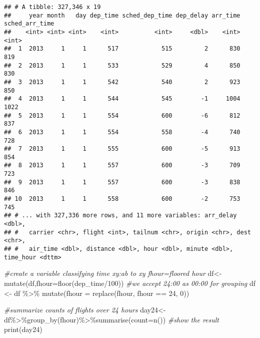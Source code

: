 \documentclass[
]{article}
\newenvironment{Shaded}{\begin{snugshade}}{\end{snugshade}}
\newcommand{\AttributeTok}[1]{\textcolor[rgb]{0.77,0.63,0.00}{#1}}
\newcommand{\CommentTok}[1]{\textcolor[rgb]{0.56,0.35,0.01}{\textit{#1}}}
\newcommand{\DecValTok}[1]{\textcolor[rgb]{0.00,0.00,0.81}{#1}}
\newcommand{\FunctionTok}[1]{\textcolor[rgb]{0.00,0.00,0.00}{#1}}
\newcommand{\NormalTok}[1]{#1}
\newcommand{\OtherTok}[1]{\textcolor[rgb]{0.56,0.35,0.01}{#1}}
\newcommand{\SpecialCharTok}[1]{\textcolor[rgb]{0.00,0.00,0.00}{#1}}
\begin{document}
\begin{verbatim}
## # A tibble: 327,346 x 19
##     year month   day dep_time sched_dep_time dep_delay arr_time sched_arr_time
##    <int> <int> <int>    <int>          <int>     <dbl>    <int>          <int>
##  1  2013     1     1      517            515         2      830            819
##  2  2013     1     1      533            529         4      850            830
##  3  2013     1     1      542            540         2      923            850
##  4  2013     1     1      544            545        -1     1004           1022
##  5  2013     1     1      554            600        -6      812            837
##  6  2013     1     1      554            558        -4      740            728
##  7  2013     1     1      555            600        -5      913            854
##  8  2013     1     1      557            600        -3      709            723
##  9  2013     1     1      557            600        -3      838            846
## 10  2013     1     1      558            600        -2      753            745
## # ... with 327,336 more rows, and 11 more variables: arr_delay <dbl>,
## #   carrier <chr>, flight <int>, tailnum <chr>, origin <chr>, dest <chr>,
## #   air_time <dbl>, distance <dbl>, hour <dbl>, minute <dbl>, time_hour <dttm>
\end{verbatim}

\begin{Shaded}
\begin{Highlighting}[]
\CommentTok{\#create a variable classifying time xy:ab to xy fhour=floored hour}
\NormalTok{df}\OtherTok{\textless{}{-}}\FunctionTok{mutate}\NormalTok{(df,}\AttributeTok{fhour=}\FunctionTok{floor}\NormalTok{(dep\_time}\SpecialCharTok{/}\DecValTok{100}\NormalTok{))}
\CommentTok{\#we accept 24:00 as 00:00 for grouping}
\NormalTok{df }\OtherTok{\textless{}{-}}\NormalTok{ df }\SpecialCharTok{\%\textgreater{}\%} \FunctionTok{mutate}\NormalTok{(}\AttributeTok{fhour =} \FunctionTok{replace}\NormalTok{(fhour, fhour }\SpecialCharTok{==} \DecValTok{24}\NormalTok{, }\DecValTok{0}\NormalTok{))}

\CommentTok{\#summarize counts of flights over 24 hours}
\NormalTok{day24}\OtherTok{\textless{}{-}}\NormalTok{df}\SpecialCharTok{\%\textgreater{}\%}\FunctionTok{group\_by}\NormalTok{(fhour)}\SpecialCharTok{\%\textgreater{}\%}\FunctionTok{summarise}\NormalTok{(}\AttributeTok{count=}\FunctionTok{n}\NormalTok{())}
\CommentTok{\#show the result}
\FunctionTok{print}\NormalTok{(day24)}
\end{Highlighting}
\end{Shaded}
\end{document}
